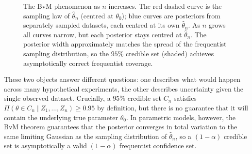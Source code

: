 \begin{figure}[H]
\caption{The BvM phenomenon as $n$ increases. The red dashed curve is the sampling law of $\hat\theta_n$ (centred at $\theta_0$); blue curves are posteriors from separately sampled datasets, each centred at its own $\hat\theta_n$. As $n$ grows all curves narrow, but each posterior stays centred at $\hat\theta_n$. The posterior width approximately matches the spread of the frequentist sampling distribution, so the $95\%$ credible set (shaded) achieves asymptotically correct frequentist coverage.}
\label{fig: BvM schematic}
\end{figure}

These two objects answer different questions: one describes what would happen across many hypothetical experiments, the other describes uncertainty given the single observed dataset. Crucially, a $95\%$ credible set $C_n$ satisfies $\Pi(\theta \in C_n \mid Z_1,\ldots,Z_n) \geq 0.95$ by definition, but there is no guarantee that it will contain the underlying true parameter $\theta_0$. In parametric models, however, the BvM theorem guarantees that the posterior converges in total variation to the same limiting Gaussian as the sampling distribution of $\hat\theta_n$, so a $(1-\alpha)$ credible set is asymptotically a valid $(1-\alpha)$ frequentist confidence set.




